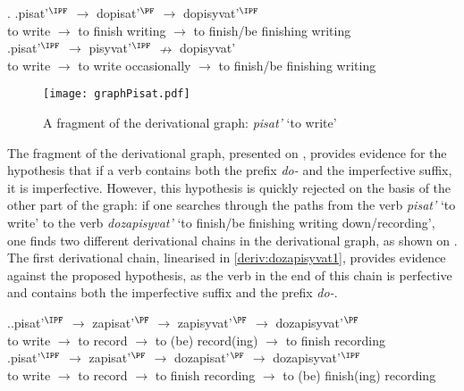 \ex.\label{deriv1} \ag.\label{deriv1-1}pisat'$^{\IPF}$ $\rightarrow$ dopisat'$^{\PF}$ $\rightarrow$ dopisyvat'$^{\IPF}$\\
{to write} $\rightarrow$ {to finish writing} $\rightarrow$ {to finish/be finishing writing}\\
\bg.\label{deriv1-2}pisat'$^{\IPF}$ $\rightarrow$ pisyvat'$^{\IPF}$ $\nrightarrow$ dopisyvat'\\
{to write} $\rightarrow$ {to write occasionally} $\rightarrow$ {to finish/be finishing writing}\\

\begin{figure}
\begin{center}
\texttt{[image: graphPisat.pdf]}
\caption{A fragment of the derivational graph: \textit{pisat'} `to write'\label{tree:dopisyvat}}
\end{center}
\end{figure}

The fragment of the derivational graph, presented on , provides evidence for the hypothesis that if a verb contains both the prefix \textit{do-} and the imperfective suffix, it is imperfective. However, this hypothesis is quickly rejected on the basis of the other part of the graph: if one searches through the paths from the verb \textit{pisat'} `to write' to the verb \textit{dozapisyvat'} `to finish/be finishing writing down/recording', one finds two different derivational chains in the derivational graph, as shown on . The first derivational chain, linearised in \ref{deriv:dozapisyvat1}, provides evidence against the proposed hypothesis, as the verb in the end of this chain is perfective and contains both the imperfective suffix and the prefix \textit{do-}. 

\ex.\label{deriv:dozapisyvat}\ag.\label{deriv:dozapisyvat1}pisat'$^{\IPF}$ $\rightarrow$ zapisat'$^{\PF}$ $\rightarrow$ zapisyvat'$^{\PF}$ $\rightarrow$ dozapisyvat'$^{\PF}$\\
{to write} $\rightarrow$ {to record} $\rightarrow$ {to (be) record(ing)} $\rightarrow$ {to finish recording}\\
\bg.\label{deriv:dozapisyvat2}pisat'$^{\IPF}$ $\rightarrow$ zapisat'$^{\PF}$ $\rightarrow$ dozapisat'$^{\PF}$ $\rightarrow$ dozapisyvat'$^{\IPF}$\\
{to write} $\rightarrow$ {to record} $\rightarrow$ {to finish recording} $\rightarrow$ {to (be) finish(ing) recording}\\				

